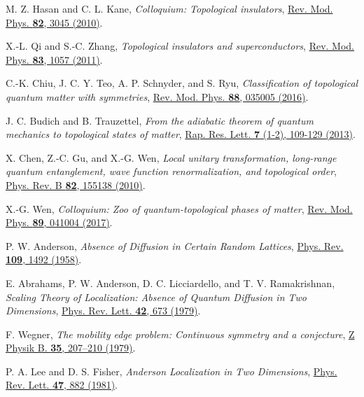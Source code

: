 \documentclass[aps,prl,amsmath,amssymb,twocolumn, superscriptaddress]{revtex4-2}
\begin{document}
\begin{thebibliography}{10}
M. Z. Hasan and C. L. Kane, {\em Colloquium: Topological insulators}, \href{https://journals.aps.org/rmp/abstract/10.1103/RevModPhys.82.3045}{Rev. Mod. Phys. {\bf{82}}, 3045 (2010)}.

X.-L. Qi and S.-C. Zhang, {\em Topological insulators and superconductors}, \href{https://journals.aps.org/rmp/abstract/10.1103/RevModPhys.83.1057}{Rev. Mod. Phys. {\bf{83}}, 1057 (2011)}.

C.-K. Chiu, J. C. Y. Teo, A. P. Schnyder, and S. Ryu, {\em Classification of topological quantum matter with symmetries}, \href{https://journals.aps.org/rmp/abstract/10.1103/RevModPhys.88.035005}{Rev. Mod. Phys. {\bf{88}}, 035005 (2016)}.

J. C. Budich and B. Trauzettel, {\em From the adiabatic theorem of quantum mechanics to topological states of matter}, \href{https://onlinelibrary.wiley.com/doi/10.1002/pssr.201206416}{Rap. Res. Lett. {\bf{7}} (1-2), 109-129 (2013)}.

X. Chen, Z.-C. Gu, and X.-G. Wen, {\em Local unitary transformation, long-range quantum entanglement, wave function renormalization, and topological order}, \href{https://journals.aps.org/prb/abstract/10.1103/PhysRevB.82.155138}{Phys. Rev. B {\bfseries 82}, 155138 (2010)}.

X.-G. Wen, {\em Colloquium: Zoo of quantum-topological phases of matter}, \href{https://journals.aps.org/rmp/abstract/10.1103/RevModPhys.89.041004}{Rev. Mod. Phys. {\bf{89}}, 041004 (2017)}.

P. W. Anderson, {\em Absence of Diffusion in Certain Random Lattices}, \href{https://journals.aps.org/pr/abstract/10.1103/PhysRev.109.1492}{Phys. Rev. {\bfseries 109}, 1492 (1958)}.

E. Abrahams, P. W. Anderson, D. C. Licciardello, and T. V. Ramakrishnan, {\em Scaling Theory of Localization: Absence of Quantum Diffusion in Two Dimensions}, \href{https://journals.aps.org/prl/abstract/10.1103/PhysRevLett.42.673}{Phys. Rev. Lett. {\bfseries 42}, 673 (1979)}.

F. Wegner, {\em The mobility edge problem: Continuous symmetry and a conjecture}, \href{https://link.springer.com/article/10.1007/BF01319839}{Z Physik B. {\bfseries 35}, 207–210 (1979)}.

P. A. Lee and D. S. Fisher, {\em Anderson Localization in Two Dimensions}, \href{https://journals.aps.org/prl/abstract/10.1103/PhysRevLett.47.882}{Phys. Rev. Lett. {\bfseries 47}, 882 (1981)}.


\end{thebibliography}
\end{document}
